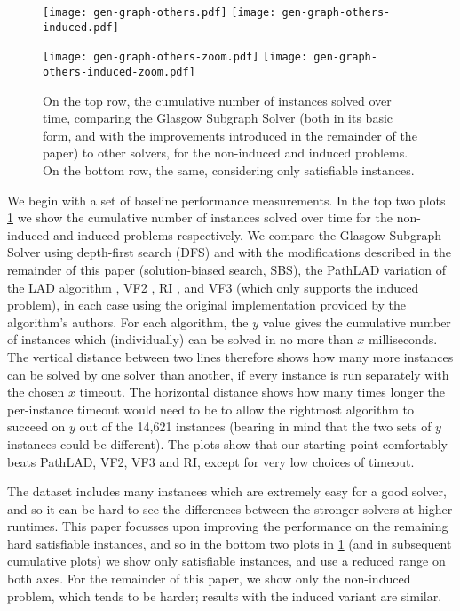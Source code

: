 \documentclass[runningheads]{llncs}
\begin{document}
\begin{figure}[tb]
    \texttt{[image: gen-graph-others.pdf]}
    \hfill
    \texttt{[image: gen-graph-others-induced.pdf]}

    \bigskip

    \texttt{[image: gen-graph-others-zoom.pdf]}
    \hfill
    \texttt{[image: gen-graph-others-induced-zoom.pdf]}

    \caption{On the top row, the cumulative number of instances solved over time, comparing the
    Glasgow Subgraph Solver (both in its basic form, and with the improvements introduced in the
    remainder of the paper) to other solvers, for the non-induced and induced problems. On the
    bottom row, the same, considering only satisfiable instances.}
    \label{figure:others}
\end{figure}

We begin with a set of baseline performance measurements. In the top
two plots \cref{figure:others} we show the cumulative number of instances solved over time for the
non-induced and induced problems respectively. We compare the Glasgow Subgraph Solver using
depth-first search (DFS) and with the modifications described in the remainder of this paper
(solution-biased search, SBS), the PathLAD variation of the LAD algorithm
\cite{DBLP:journals/ai/Solnon10,DBLP:conf/lion/KotthoffMS16}, VF2
\cite{DBLP:journals/pami/CordellaFSV04}, RI \cite{DBLP:journals/bmcbi/BonniciGPSF13}, and VF3
\cite{DBLP:conf/gbrpr/CarlettiFSV17} (which only supports the induced problem), in each case using
the original implementation provided by the algorithm's authors. For each algorithm, the $y$ value
gives the cumulative number of instances which (individually) can be solved in no more than $x$
milliseconds.  The vertical distance between two lines therefore shows how many more instances can
be solved by one solver than another, if every instance is run separately with the chosen $x$
timeout. The horizontal distance shows how many times longer the per-instance timeout would need to
be to allow the rightmost algorithm to succeed on $y$ out of the 14,621 instances (bearing in mind
that the two sets of $y$ instances could be different).  The plots show that our starting point
comfortably beats PathLAD, VF2, VF3 and RI, except for very low choices of timeout.

The dataset includes many instances which are extremely easy for a good solver, and so it can be
hard to see the differences between the stronger solvers at higher runtimes. This paper focusses
upon improving the performance on the remaining hard satisfiable instances, and so in the bottom two
plots in \cref{figure:others} (and in subsequent cumulative plots) we show only satisfiable
instances, and use a reduced range on both axes.  For the remainder of this paper, we show only the
non-induced problem, which tends to be harder; results with the induced variant are similar.
\end{document}
